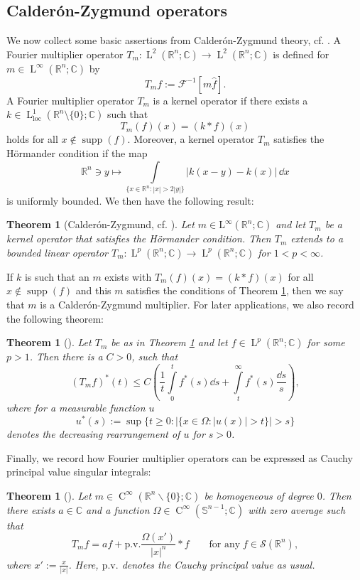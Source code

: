 \documentclass[a4paper,11pt]{amsart}
\numberwithin{equation}{section}
\newcommand{\R}{\mathbb{R}}
\newcommand{\lebe}{\operatorname{L}}
\newcommand{\hold}{\operatorname{C}}
\newtheorem{satz}[defi]{Theorem}
\begin{document}
	\subsection{Calderón-Zygmund operators} We now collect some basic assertions from Calderón-Zygmund theory, cf. \cite{duoandikoetxea_fourier_2001}.
	A Fourier multiplier operator $T_m : \lebe^2(\mathbb{R}^n; \mathbb{C}) \to \lebe^2(\mathbb{R}^n; \mathbb{C})$ is defined for $m \in \lebe^\infty(\mathbb{R}^n; \mathbb{C})$ by
	\[
	T_m f := \mathscr{F}^{-1} [ m \hat{f} ].
	\]
	A Fourier multiplier operator $T_m$ is a kernel operator if there exists a $k \in \lebe^1_{\text{loc}}(\mathbb{R}^n \setminus \{0\}; \mathbb{C})$ such that
	\[
	T_m(f)(x) = (k \ast f)(x)
	\]
	holds for all $x \not \in \operatorname{supp}(f)$.
	Moreover, a kernel operator $T_m$ satisfies the Hörmander condition if the map
	\[
	\mathbb{R}^n \ni y \mapsto \int \limits_{\{x \in \mathbb{R}^n : |x| > 2|y|\}} |k(x-y) - k(x)| \, \dd{x}
	\]
	is uniformly bounded. We then have the following result:
	\begin{satz}[Calderón-Zygmund, cf. \cite{calderon_existence_1952}] \label{thm:Calderon}
		Let $m \in \mathrm{L}^\infty(\R^n;\mathbb{C})$ and let $T_m$ be a kernel operator that satisfies the H\"ormander condition. Then $T_m$ extends to a bounded linear operator $T_m : \lebe^p(\mathbb{R}^n ;\mathbb{C}) \to \lebe^p(\mathbb{R}^n ;\mathbb{C})$ for $1 < p < \infty$.
	\end{satz}
	If $k$ is such that an $m$ exists with $T_m(f)(x) = (k \ast f)(x)$ for all $ x\not \in \operatorname{supp}(f)$ and this $m$ satisfies the conditions of Theorem \ref{thm:Calderon}, then we say that $m$ is a Calderón-Zygmund multiplier. For later applications, we also record the following theorem:  
	\begin{satz} [{{\cite[Theorem 1]{bagby_rearranged_1986_2}}}]
		\label{thm:bagby}
		Let $T_m$ be as in Theorem \ref{thm:Calderon} and let $f \in \lebe^p(\R^n; \mathbb{C})$ for some $p>1$. Then there is a $C>0$, such that \[
		(T_mf)^*(t) \leq C \left( \frac{1}{t} \int \limits_0^t f^*(s) \dd{s} + \int \limits_t^\infty f^*(s) \frac{\dd{s}}{s} \right),
		\]
		where for a measurable function $u$ $$u^*(s) := \sup \{ t \geq 0: |\{x \in \Omega: |u(x)| > t\}| > s \}$$ denotes the \emph{decreasing rearrangement} of $u$ for $s > 0$. 
	\end{satz}
	Finally, we record how Fourier multiplier operators can be expressed as Cauchy principal value singular integrals: 
	\begin{satz}[{{\cite[Theorem 4.13]{duoandikoetxea_fourier_2001}}}] \label{thm:avg}
		Let $m \in \hold^\infty(\R^n \backslash \{0\};\mathbb{C})$ be homogeneous of degree $0$. Then there exists $a \in \mathbb{C}$ and a function $\Omega \in \hold^\infty(\mathbb{S}^{n-1};\mathbb{C})$ with zero average such that   \[
		T_m f = af + \mathrm{p.v.} \frac{\Omega(x')}{|x|^n} \ast f\qquad\text{for any}\;f\in\mathscr{S}(\R^{n}), 
		\]
		where $x':=\frac{x}{|x|}$. Here, $\mathrm{p.v.}$ denotes the Cauchy principal value as usual. 
	\end{satz}
\end{document}
